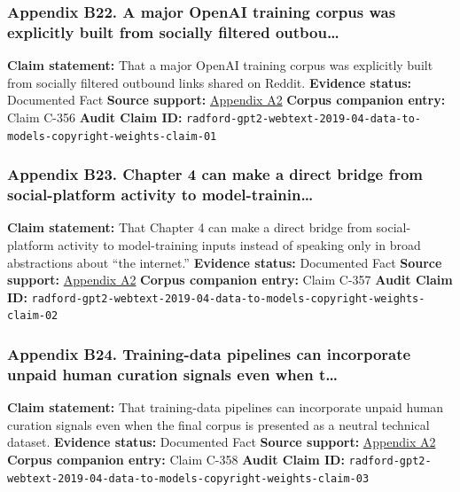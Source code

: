 \documentclass[
  american,
  11pt,
  letterpaper,
]{article}
\begin{document}
\subsubsection{Appendix B22. A major OpenAI training corpus was
explicitly built from socially filtered
outbou\ldots{}}\label{appendix-b22-a-major-openai-training-corpus-was-explicitly-built-from-socially-filtered-outbou}

\textbf{Claim statement:} That a major OpenAI training corpus was
explicitly built from socially filtered outbound links shared on Reddit.
\textbf{Evidence status:} Documented Fact \textbf{Source support:}
\hyperref[appendix-a2-language-models-are-unsupervised-multitask-learners]{Appendix
A2} \textbf{Corpus companion entry:} Claim C-356 \textbf{Audit Claim
ID:}
\texttt{radford-gpt2-webtext-2019-04-data-to-models-copyright-weights-claim-01}

\subsubsection{Appendix B23. Chapter 4 can make a direct bridge from
social-platform activity to
model-trainin\ldots{}}\label{appendix-b23-chapter-4-can-make-a-direct-bridge-from-social-platform-activity-to-model-trainin}

\textbf{Claim statement:} That Chapter 4 can make a direct bridge from
social-platform activity to model-training inputs instead of speaking
only in broad abstractions about ``the internet.'' \textbf{Evidence
status:} Documented Fact \textbf{Source support:}
\hyperref[appendix-a2-language-models-are-unsupervised-multitask-learners]{Appendix
A2} \textbf{Corpus companion entry:} Claim C-357 \textbf{Audit Claim
ID:}
\texttt{radford-gpt2-webtext-2019-04-data-to-models-copyright-weights-claim-02}

\subsubsection{Appendix B24. Training-data pipelines can incorporate
unpaid human curation signals even when
t\ldots{}}\label{appendix-b24-training-data-pipelines-can-incorporate-unpaid-human-curation-signals-even-when-t}

\textbf{Claim statement:} That training-data pipelines can incorporate
unpaid human curation signals even when the final corpus is presented as
a neutral technical dataset. \textbf{Evidence status:} Documented Fact
\textbf{Source support:}
\hyperref[appendix-a2-language-models-are-unsupervised-multitask-learners]{Appendix
A2} \textbf{Corpus companion entry:} Claim C-358 \textbf{Audit Claim
ID:}
\texttt{radford-gpt2-webtext-2019-04-data-to-models-copyright-weights-claim-03}
\end{document}
